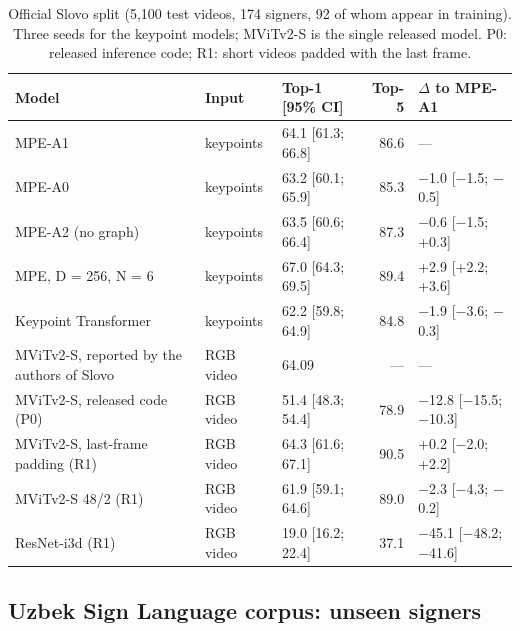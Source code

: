 \documentclass[a4paper,fleqn]{cas-dc}
\begin{document}
\begin{table}[t]
\caption{Official Slovo split (5,100 test videos, 174 signers, 92 of whom appear in training). Three seeds for the keypoint models; MViTv2-S is the single released model. P0: released inference code; R1: short videos padded with the last frame.}\label{tab:official}
\footnotesize
\centering
\begin{tabular}{lllrl}
\toprule
\textbf{Model} & \textbf{Input} & \textbf{Top-1 [95\% CI]} & \textbf{Top-5} & \textbf{$\Delta$ to MPE-A1} \\
\midrule
MPE-A1 & keypoints & 64.1 [61.3; 66.8] & 86.6 & --- \\
MPE-A0 & keypoints & 63.2 [60.1; 65.9] & 85.3 & $-$1.0 [$-$1.5; $-$0.5] \\
MPE-A2 (no graph) & keypoints & 63.5 [60.6; 66.4] & 87.3 & $-$0.6 [$-$1.5; +0.3] \\
MPE, D = 256, N = 6 & keypoints & 67.0 [64.3; 69.5] & 89.4 & +2.9 [+2.2; +3.6] \\
Keypoint Transformer & keypoints & 62.2 [59.8; 64.9] & 84.8 & $-$1.9 [$-$3.6; $-$0.3] \\
MViTv2-S, reported by the authors of Slovo & RGB video & 64.09 & --- & --- \\
MViTv2-S, released code (P0) & RGB video & 51.4 [48.3; 54.4] & 78.9 & $-$12.8 [$-$15.5; $-$10.3] \\
MViTv2-S, last-frame padding (R1) & RGB video & 64.3 [61.6; 67.1] & 90.5 & +0.2 [$-$2.0; +2.2] \\
MViTv2-S 48/2 (R1) & RGB video & 61.9 [59.1; 64.6] & 89.0 & $-$2.3 [$-$4.3; $-$0.2] \\
ResNet-i3d (R1) & RGB video & 19.0 [16.2; 22.4] & 37.1 & $-$45.1 [$-$48.2; $-$41.6] \\
\bottomrule
\end{tabular}
\end{table}

\hypertarget{uzbek-sign-language-corpus-unseen-signers}{%
\subsection{Uzbek Sign Language corpus: unseen signers}\label{uzbek-sign-language-corpus-unseen-signers}}
\end{document}
